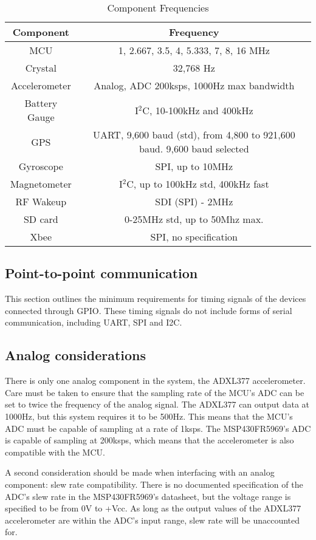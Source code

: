 \begin{table}[H]
  \centering
  \caption{Component Frequencies}
    \begin{tabular}{|c|c|}
    \hline
    Component & Frequency \\
    \hline \hline
    MCU   & 1, 2.667, 3.5, 4, 5.333, 7, 8, 16 MHz \\ \hline
    Crystal & 32,768 Hz \\ \hline
    Accelerometer & Analog, ADC 200ksps, 1000Hz max bandwidth \\ \hline
    Battery Gauge & I$^2$C, 10-100kHz and 400kHz \\ \hline
    GPS   & UART, 9,600 baud (std), from 4,800 to 921,600 baud. 9,600 baud selected\\ \hline
    Gyroscope & SPI, up to 10MHz \\ \hline
    Magnetometer & I$^2$C, up to 100kHz std, 400kHz fast \\ \hline
    RF Wakeup & SDI (SPI) - 2MHz \\ \hline
    SD card & 0-25MHz std, up to 50Mhz max. \\ \hline
    Xbee  & SPI, no specification \\ \hline
    \end{tabular}
  \label{tab:compFreq}
\end{table}

\subsection{Point-to-point communication}
This section outlines the minimum requirements for timing signals of the devices connected through GPIO. These timing signals do not include forms of serial communication, including UART, SPI and I2C.



\subsection{Analog considerations}
There is only one analog component in the system, the ADXL377 accelerometer. Care must be taken to ensure that the sampling rate of the MCU's ADC can be set to twice the frequency of the analog signal. The ADXL377 can output data at 1000Hz, but this system requires it to be 500Hz. This means that the MCU's ADC must be capable of sampling at a rate of 1ksps. The MSP430FR5969's ADC is capable of sampling at 200ksps, which means that the accelerometer is also compatible with the MCU.

A second consideration should be made when interfacing with an analog component: slew rate compatibility. There is no documented specification of the ADC's slew rate in the MSP430FR5969's datasheet, but the voltage range is specified to be from 0V to +Vcc. As long as the output values of the ADXL377 accelerometer are within the ADC's input range, slew rate will be unaccounted for.




